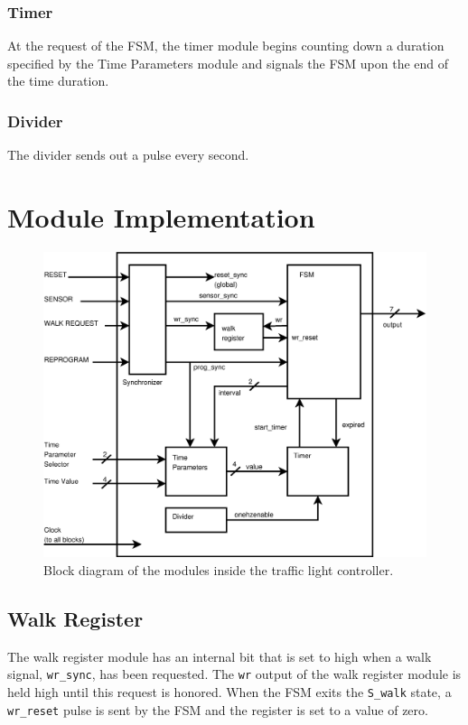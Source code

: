 \documentclass{article}
\begin{document}
		\subsubsection{Timer}
		At the request of the FSM, the timer module begins counting down a
		duration specified by the Time Parameters module and signals the
		FSM upon the end of the time duration.

		\subsubsection{Divider}
		The divider sends out a pulse every second.

\section{Module Implementation}
	\begin{figure}[h]
	\centering
	\includegraphics[scale=0.4]{block.ps}
	\caption{Block diagram of the modules inside the traffic light controller.}
	\label{fig:block}
	\end{figure}
	\subsection{Walk Register}
	The walk register module has an internal bit that is set to high when a
	walk signal, \texttt{wr\_sync}, has been requested.  The \texttt{wr}
	output of the walk register module is held high until this request is
	honored.  When the FSM exits the \texttt{S\_walk} state, a
	\texttt{wr\_reset} pulse is sent by the FSM and the register is set to
	a value of zero.
\end{document}
